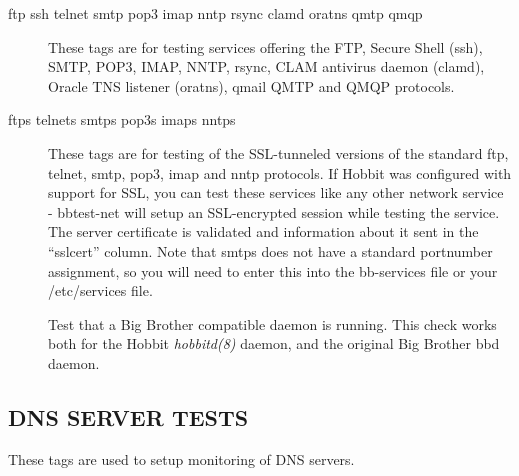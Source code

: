  \begin{description}
\item[ftp ssh telnet smtp pop3 imap nntp rsync clamd oratns qmtp qmqp]
  These tags are for testing services offering the FTP, Secure Shell
  (ssh), SMTP, POP3, IMAP, NNTP, rsync, CLAM antivirus daemon (clamd),
  Oracle TNS listener (oratns), qmail QMTP and QMQP protocols. 


 

\item[ftps telnets smtps pop3s imaps nntps] These tags are for testing
  of the SSL-tunneled versions of the standard ftp, telnet, smtp,
  pop3, imap and nntp protocols. If Hobbit was configured with support
  for SSL, you can test these services like any other network service
  - bbtest-net will setup an SSL-encrypted session while testing the
  service. The server certificate is validated and information about
  it sent in the ``sslcert'' column. Note that smtps does not have a
  standard portnumber assignment, so you will need to enter this into
  the bb-services file or your /etc/services file. 


 

\item[] Test that a Big Brother compatible daemon is running. This
  check works both for the Hobbit \emph{hobbitd(8)} daemon, and the
  original Big Brother bbd daemon. 


 


 


\end{description}

\subsection{DNS SERVER TESTS}
 These tags are used to setup monitoring of DNS servers. 

